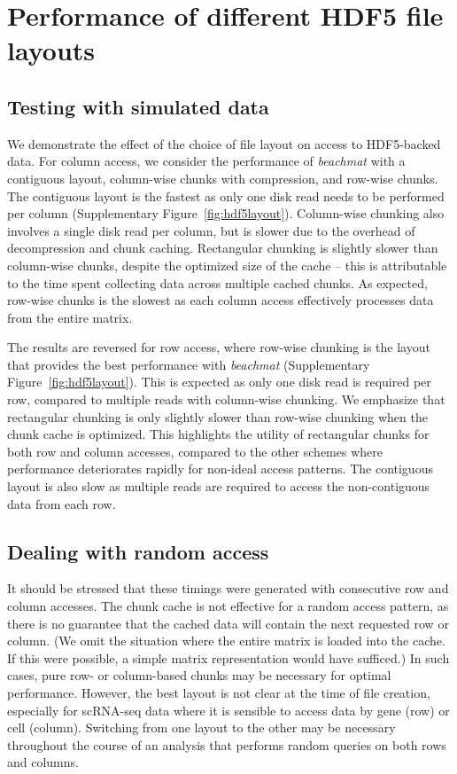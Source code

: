 \documentclass{article}
\newcommand{\beachmat}{\textit{beachmat}}
\begin{document}
\section{Performance of different HDF5 file layouts}

\subsection{Testing with simulated data}
We demonstrate the effect of the choice of file layout on access to HDF5-backed data.
For column access, we consider the performance of \beachmat{} with a contiguous layout, column-wise chunks with compression, and row-wise chunks.
The contiguous layout is the fastest as only one disk read needs to be performed per column (Supplementary Figure~\ref{fig:hdf5layout}).
Column-wise chunking also involves a single disk read per column, but is slower due to the overhead of decompression and chunk caching.
Rectangular chunking is slightly slower than column-wise chunks, despite the optimized size of the cache -- this is attributable to the time spent collecting data across multiple cached chunks.
As expected, row-wise chunks is the slowest as each column access effectively processes data from the entire matrix.

The results are reversed for row access, where row-wise chunking is the layout that provides the best performance with \beachmat{} (Supplementary Figure~\ref{fig:hdf5layout}).
This is expected as only one disk read is required per row, compared to multiple reads with column-wise chunking.
We emphasize that rectangular chunking is only slightly slower than row-wise chunking when the chunk cache is optimized.
This highlights the utility of rectangular chunks for both row and column accesses, compared to the other schemes where performance deteriorates rapidly for non-ideal access patterns.
The contiguous layout is also slow as multiple reads are required to access the non-contiguous data from each row.

\subsection{Dealing with random access}
\label{sec:random}

It should be stressed that these timings were generated with consecutive row and column accesses.
The chunk cache is not effective for a random access pattern, as there is no guarantee that the cached data will contain the next requested row or column.
(We omit the situation where the entire matrix is loaded into the cache.
If this were possible, a simple matrix representation would have sufficed.)
In such cases, pure row- or column-based chunks may be necessary for optimal performance.
However, the best layout is not clear at the time of file creation, especially for scRNA-seq data where it is sensible to access data by gene (row) or cell (column).
Switching from one layout to the other may be necessary throughout the course of an analysis that performs random queries on both rows and columns.
\end{document}
